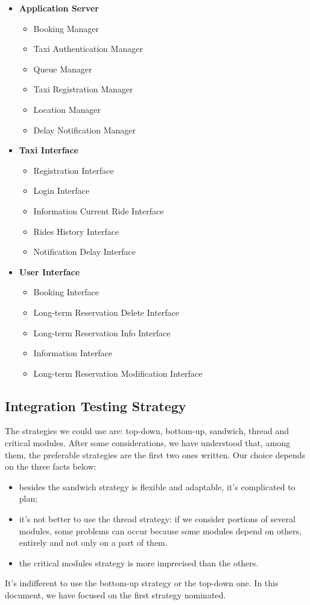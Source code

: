 		\begin{itemize}
			\item \textbf{Application Server}
			\begin{itemize}
				\item Booking Manager
				\item Taxi Authentication Manager
				\item Queue Manager
				\item Taxi Registration Manager
				\item Location Manager
				\item Delay Notification Manager
			\end{itemize}
			\item \textbf{Taxi Interface}
			\begin{itemize}
				\item Registration Interface
				\item Login Interface
				\item Information Current Ride Interface
				\item Rides History Interface
				\item Notification Delay Interface
			\end{itemize}
			\item \textbf{User Interface}
			\begin{itemize}
				\item Booking Interface
				\item Long-term Reservation Delete Interface
				\item Long-term Reservation Info Interface
				\item Information Interface
				\item Long-term Reservation Modification Interface
			\end{itemize}
		\end{itemize}
\subsection{Integration Testing Strategy}
The strategies we could use are: top-down, bottom-up, sandwich, thread and critical modules. After some considerations, we have understood that, among them, the preferable strategies are the first two ones written. Our choice depends on the three facts below:
	\begin{itemize}
		\item besides the sandwich strategy is flexible and adaptable, it's complicated to plan;
		\item it's not better to use the thread strategy: if we consider portions of several modules, some problems can occur because some modules depend on 		others, entirely and not only on a part of them.
		\item the critical modules strategy is more imprecised than the others.      
	\end{itemize} 
It's indifferent to use the bottom-up strategy or the top-down one. In this document, we have focused on the first strategy nominated.
